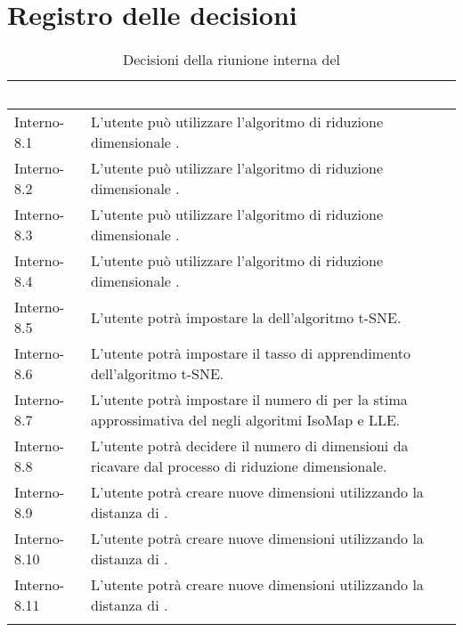 \section{Registro delle decisioni}
{
\renewcommand{\arraystretch}{1.5}
\centering
\begin{longtable}{C{3cm} C{9cm}}
\textcolor{white}{\textbf{Codice}}&
\textcolor{white}{\textbf{Decisione}}\\	

\endhead
		
Interno-8.1 & L'utente può utilizzare l'algoritmo di riduzione dimensionale \textit{}.\\
Interno-8.2 & L'utente può utilizzare l'algoritmo di riduzione dimensionale \textit{}.\\
Interno-8.3 & L'utente può utilizzare l'algoritmo di riduzione dimensionale \textit{}.\\
Interno-8.4 & L'utente può utilizzare l'algoritmo di riduzione dimensionale \textit{}.\\
Interno-8.5 & L'utente potrà impostare la \textit{} dell'algoritmo t-SNE.\\
Interno-8.6 & L'utente potrà impostare il tasso di apprendimento dell'algoritmo t-SNE.\\
Interno-8.7 & L'utente potrà impostare il numero di \textit{} per la stima approssimativa del \textit{} negli algoritmi IsoMap e LLE.\\
Interno-8.8 & L'utente potrà decidere il numero di dimensioni da ricavare dal processo di riduzione dimensionale.\\
Interno-8.9 & L'utente potrà creare nuove dimensioni utilizzando la distanza di \textit{}.\\
Interno-8.10 & L'utente potrà creare nuove dimensioni utilizzando la distanza di \textit{}.\\
Interno-8.11 & L'utente potrà creare nuove dimensioni utilizzando la distanza di \textit{}.\\
\caption{Decisioni della riunione interna del \Data{}}
\end{longtable}
}

